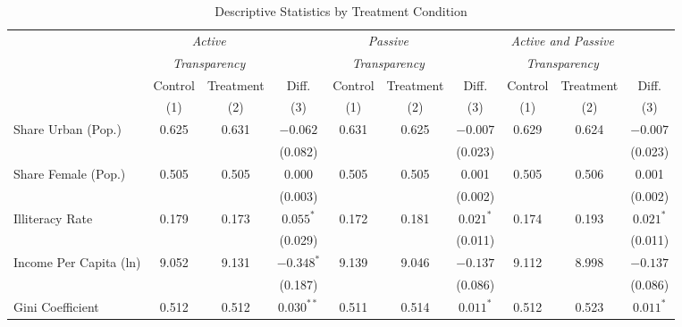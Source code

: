 \begin{table}[!htbp]
\centering
\caption{Descriptive Statistics by Treatment Condition}
\label{tab:descriptivestats3}
\scriptsize
\begin{tabular}{@{\extracolsep{-4pt}}l@{\extracolsep{-3pt}}ccccccccc}
\hline
\hline
& \multicolumn{2}{c}{\emph{Active}} & & \multicolumn{2}{c}{\emph{Passive}} & & \multicolumn{2}{c}{\emph{Active and Passive}} \T \\
& \multicolumn{2}{c}{\emph{Transparency}} & & \multicolumn{2}{c}{\emph{Transparency}} & & \multicolumn{2}{c}{\emph{Transparency}} \B \\
\cline{2-3} \cline{5-6} \cline{8-9}
& Control & Treatment & Diff. & Control & Treatment & Diff. & Control & Treatment & Diff. \T \B \\
& (1) & (2) & (3) & (1) & (2) & (3) & (1) & (2) & (3) \B \\
\hline
Share Urban (Pop.)                   & 0.625 & 0.631 & $-0.062$       & 0.631 & 0.625 & $-0.007$       &  0.629 & 0.624 & $-0.007$       \T \\
                                     &       &       & (0.082)        &       &       & (0.023)        &        &       & (0.023)           \\
Share Female (Pop.)                  & 0.505 & 0.505 & 0.000          & 0.505 & 0.505 & 0.001          &  0.505 & 0.506 & 0.001             \\
                                     &       &       & (0.003)        &       &       & (0.002)        &        &       & (0.002)           \\
Illiteracy Rate                      & 0.179 & 0.173 & $0.055^{*}$    & 0.172 & 0.181 & $0.021^{*}$    &  0.174 & 0.193 & $0.021^{*}$       \\
                                     &       &       & (0.029)        &       &       & (0.011)        &        &       & (0.011)           \\
Income Per Capita (ln)               & 9.052 & 9.131 & $-0.348^{*}$   & 9.139 & 9.046 & $-0.137$       &  9.112 & 8.998 & $-0.137$          \\
                                     &       &       & (0.187)        &       &       & (0.086)        &        &       & (0.086)           \\
Gini Coefficient                     & 0.512 & 0.512 & $0.030^{**}$   & 0.511 & 0.514 & $0.011^{*}$    &  0.512 & 0.523 & $0.011^{*}$       \\

\end{tabular}
\end{table}
